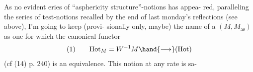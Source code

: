 As no evident eries of ``asphericity structure''-notions has appea-%
red, paralleling the series of test-notions  recalled by the
end of last monday's reflections (see above), I'm going to keep (provi-%
sionally only, maybe) the name of a \hand{\uline{\textcolor{black}{modelizing}}} \hand{\uline{\textcolor{black}{asphericity}}} \hand{\uline{\textcolor{black}{structure}}}
$(M,M_{\mathrm{as}})$ as one for which the canonical functor
\[
(1) \qquad \mathrm{Hot}_{M} = W^{-1}M \hand{\longrightarrow} (\mathrm{Hot})
\]
(cf (14) p. 240) is an equivalence. This notion at any rate is sa-%
